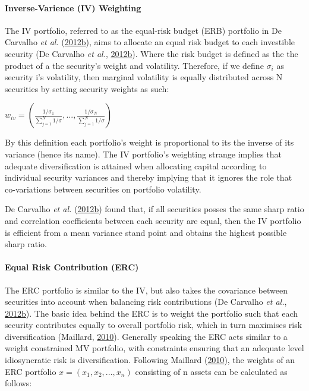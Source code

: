 \documentclass[11pt,preprint, authoryear]{elsarticle}
\numberwithin{equation}{section}
\numberwithin{figure}{section}
\numberwithin{table}{section}
\begin{document}
\hypertarget{inverse-varience-iv-weighting}{%
\paragraph{Inverse-Varience (IV)
Weighting}\label{inverse-varience-iv-weighting}}

The IV portfolio, referred to as the equal-risk budget (ERB) portfolio
in De Carvalho \emph{et al.}
(\protect\hyperlink{ref-leote}{2012}\protect\hyperlink{ref-leote}{b}),
aims to allocate an equal risk budget to each investible security (De
Carvalho \emph{et al.},
\protect\hyperlink{ref-leote}{2012}\protect\hyperlink{ref-leote}{b}).
Where the risk budget is defined as the the product of a the security's
weight and volatility. Therefore, if we define \(\sigma_i\) as security
i's volatility, then marginal volatility is equally distributed across N
securities by setting security weights as such:

\begin{center} 
$w_{iv}=(\frac{1/\sigma_1}{\sum^N_{j=1} 1/\sigma}, ...,\frac{1/\sigma_N}{\sum^N_{j=1} 1/\sigma} )$ 
\end{center}

By this definition each portfolio's weight is proportional to its the
inverse of its variance (hence its name). The IV portfolio's weighting
strange implies that adequate diversification is attained when
allocating capital according to individual security variances and
thereby implying that it ignores the role that co-variations between
securities on portfolio volatility.

De Carvalho \emph{et al.}
(\protect\hyperlink{ref-leote}{2012}\protect\hyperlink{ref-leote}{b})
found that, if all securities posses the same sharp ratio and
correlation coefficients between each security are equal, then the IV
portfolio is efficient from a mean variance stand point and obtains the
highest possible sharp ratio.

\hypertarget{equal-risk-contribution-erc}{%
\paragraph{Equal Risk Contribution
(ERC)}\label{equal-risk-contribution-erc}}

The ERC portfolio is similar to the IV, but also takes the covariance
between securities into account when balancing risk contributions (De
Carvalho \emph{et al.},
\protect\hyperlink{ref-leote}{2012}\protect\hyperlink{ref-leote}{b}).
The basic idea behind the ERC is to weight the portfolio such that each
security contributes equally to overall portfolio risk, which in turn
maximises risk diversification (Maillard,
\protect\hyperlink{ref-maillard2010}{2010}). Generally speaking the ERC
acts similar to a weight constrained MV portfolio, with constraints
ensuring that an adequate level idiosyncratic risk is diversification.
Following Maillard (\protect\hyperlink{ref-maillard2010}{2010}), the
weights of an ERC portfolio \(x=(x_1,x_2,...,x_n)\) consisting of n
assets can be calculated as follows:
\end{document}
